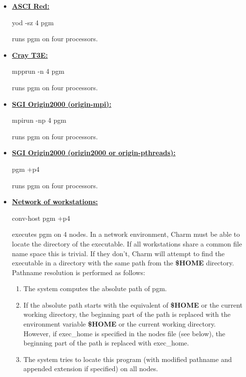 \begin{itemize}

\item \underline{\bf ASCI Red:} 
	\begin{tabbing}
	{\fexec yod -sz 4 pgm}
	\end{tabbing}
	runs {\fparm pgm} on four processors.

\item \underline{\bf Cray T3E:} 
	\begin{tabbing}
	{\fexec mpprun -n 4 pgm}
	\end{tabbing}
	runs {\fparm pgm} on four processors.

\item \underline{\bf SGI Origin2000 (origin-mpi):} 
	\begin{tabbing}
	{\fexec mpirun -np 4 pgm}
	\end{tabbing}
	runs {\fparm pgm} on four processors.

\item \underline{\bf SGI Origin2000 (origin2000 or origin-pthreads):} 
	\begin{tabbing}
	{\fexec pgm +p4}
	\end{tabbing}
	runs {\fparm pgm} on four processors.

\item \underline{\bf Network of workstations:} 
	\begin{tabbing}
	{\fexec conv-host pgm +p4}
	\end{tabbing}
	executes {\fparm pgm} on 4 nodes.  In a network environment, Charm must
	be able to locate the directory of the executable.  If all workstations
	share a common file name space this is trivial.  If they don't, Charm
	will attempt to find the executable in a directory with the same path
	from the {\bf \$HOME} directory.  Pathname resolution is performed as 
	follows:
	\begin{enumerate}
		\item The system computes the absolute path of {\fexec pgm}.
		\item If the absolute path starts with the equivalent of {\bf \$HOME} 
			or the current working directory, the beginning part of the path 
			is replaced with the environment variable {\bf \$HOME} or the 
			current working directory. However, if {\fparm exec\_home} is 
            specified in the nodes file (see below), the beginning part of
            the path is replaced with {\fparm exec\_home}.
		\item The system tries to locate this program (with modified 
			pathname and appended extension if specified) on all nodes.
	\end{enumerate}


\end{itemize}
